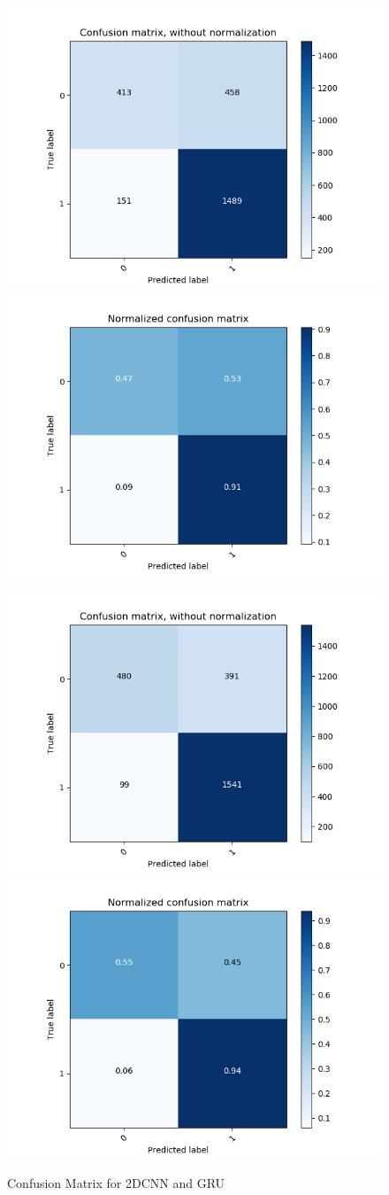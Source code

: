 \begin{figure}[H]
	\begin{minipage}[b]{\columnwidth}
		\centering
		\includegraphics[clip, width=0.45\linewidth]{fig/chapter4/3d/confusion_matrix/count_confusion_matrix_False_50_gru}
		\includegraphics[clip, width=0.45\linewidth]{fig/chapter4/3d/confusion_matrix/normalized_confusion_matrix_False_50_gru}
		\label{fig:}
	\end{minipage}

	\begin{minipage}[b]{\columnwidth}
		\centering
		\includegraphics[clip, width=0.45\linewidth]{fig/chapter4/3d/confusion_matrix/count_confusion_matrix_False_100_gru}
		\includegraphics[clip, width=0.45\linewidth]{fig/chapter4/3d/confusion_matrix/normalized_confusion_matrix_False_100_gru}
		\label{fig:}
	\end{minipage}
	
	\caption{Confusion Matrix for 2DCNN and GRU}
	\label{fig:gru_matrix}
	
\end{figure}



